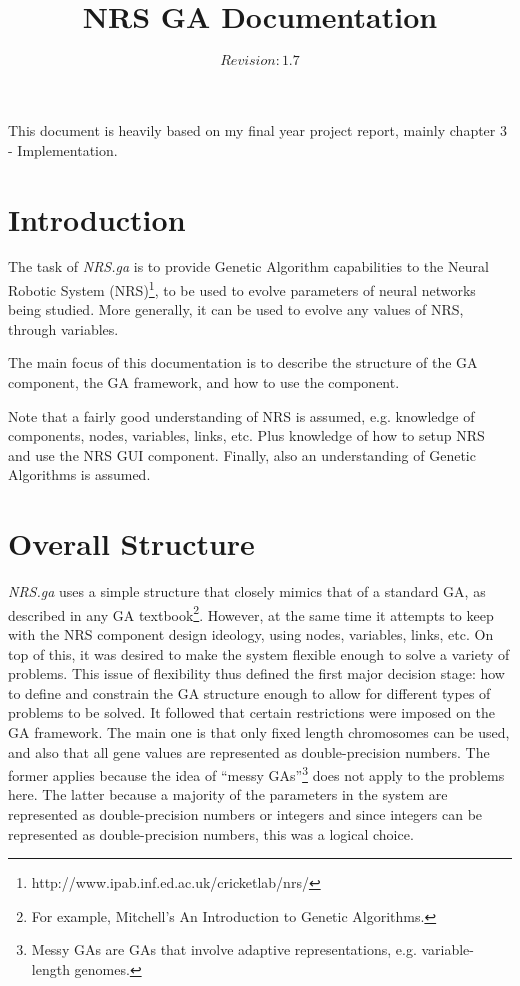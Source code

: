 \documentclass[10pt, notitlepage, a4paper]{article}
\begin{document}
\title{NRS GA Documentation}
\author{$Revision: 1.7 $}
\maketitle

\tableofcontents
\newpage

This document is heavily based on my final year project report, mainly chapter 3 - Implementation.


\section{Introduction}\label{intro}
The task of {\it NRS.ga} is to provide Genetic Algorithm capabilities to the Neural Robotic System (NRS)\footnote{http://www.ipab.inf.ed.ac.uk/cricketlab/nrs/}, to be used to evolve parameters of neural networks being studied. More generally, it can be used to evolve any values of NRS, through variables.

The main focus of this documentation is to describe the structure of the GA component, the GA framework, and how to use the component.

Note that a fairly good understanding of NRS is assumed, e.g. knowledge of components, nodes, variables, links, etc. Plus knowledge of how to setup NRS and use the NRS GUI component. Finally, also an understanding of Genetic Algorithms is assumed.

\section{Overall Structure}\label{struct}
{\it NRS.ga} uses a simple structure that closely mimics that of a standard GA, as described in any GA textbook\footnote{For example, Mitchell's An Introduction to Genetic Algorithms.}. However, at the same time it attempts to keep with the NRS component design ideology, using nodes, variables, links, etc. On top of this, it was desired to make the system flexible enough to solve a variety of problems. This issue of flexibility thus defined the first major decision stage: how to define and constrain the GA structure enough to allow for different types of problems to be solved. It followed that certain restrictions were imposed on the GA framework. The main one is that only fixed length chromosomes can be used, and also that all gene values are represented as double-precision numbers. The former applies because the idea of ``messy GAs''\footnote{Messy GAs are GAs that involve adaptive representations, e.g. variable-length genomes.} does not apply to the problems here. The latter because a majority of the parameters in the system are represented as double-precision numbers or integers and since integers can be represented as double-precision numbers, this was a logical choice.
\end{document}
